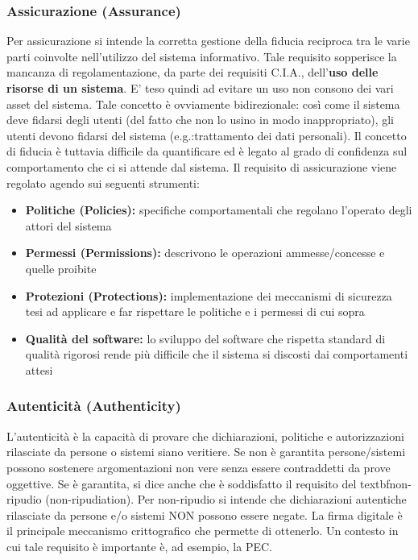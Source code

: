 \subsubsection{Assicurazione (Assurance)}
Per assicurazione si intende la corretta gestione della fiducia reciproca tra le varie parti coinvolte nell'utilizzo del sistema informativo. Tale requisito sopperisce la mancanza di regolamentazione, da parte dei requisiti C.I.A., dell'\textbf{uso delle risorse di un sistema}. E' teso quindi ad evitare un uso non consono dei vari asset del sistema. Tale concetto è ovviamente bidirezionale: così come il sistema deve fidarsi degli utenti (del fatto che non lo usino in modo inappropriato), gli utenti devono fidarsi del sistema (e.g.:trattamento dei dati personali). Il concetto di fiducia è tuttavia difficile da quantificare ed è legato al grado di confidenza sul comportamento che ci si attende dal sistema. Il requisito di assicurazione viene regolato agendo sui seguenti strumenti:
\begin{itemize} 
  \item \textbf{Politiche (Policies):} specifiche comportamentali che regolano l’operato degli attori del sistema
  \item \textbf{Permessi (Permissions):} descrivono le operazioni ammesse/concesse e quelle proibite
  \item \textbf{Protezioni (Protections):} implementazione dei meccanismi di sicurezza tesi ad applicare e far rispettare le politiche e i permessi di cui sopra
  \item \textbf{Qualità del software:} lo sviluppo del software che rispetta standard di qualità rigorosi rende più difficile che il sistema si discosti dai comportamenti attesi 
\end{itemize}

\subsubsection{Autenticità (Authenticity)}
L'autenticità è la capacità di provare che dichiarazioni, politiche e autorizzazioni rilasciate da persone o sistemi siano veritiere. Se non è garantita persone/sistemi possono sostenere argomentazioni non vere senza essere contraddetti da prove oggettive. Se è garantita, si dice anche che è soddisfatto il requisito del textbf{non-ripudio (non-ripudiation)}. Per non-ripudio si intende che dichiarazioni autentiche rilasciate da persone e/o sistemi NON possono essere negate. La firma digitale è il principale meccanismo crittografico che permette di ottenerlo. Un contesto in cui tale requisito è importante è, ad esempio, la PEC.

